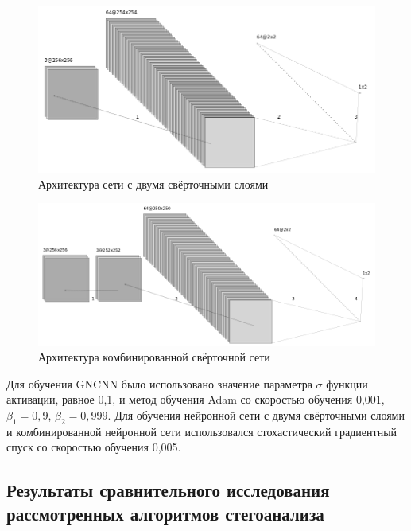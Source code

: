 \begin{figure}[!htb]
\centering
\includegraphics[width=1\textwidth]{include/graphics/french_color_architecture}
\caption{Архитектура сети с двумя свёрточными слоями}
\label{fig:FrenchCNNArchitecture}
\end{figure}

\begin{figure}[!htb]
\centering
\includegraphics[width=1\textwidth]{include/graphics/mixed_color_architecture}
\caption{Архитектура комбинированной свёрточной сети}
\label{fig:MixedCNNArchitecture}
\end{figure}

Для обучения GNCNN было использовано значение параметра $ \sigma $ функции активации, равное 0,1, и метод обучения Adam со скоростью обучения 0,001, $ \beta_1 = 0,9 $, $ \beta_2 = 0,999 $. Для обучения нейронной сети с двумя свёрточными слоями и комбинированной нейронной сети использовался стохастический градиентный спуск со скоростью обучения 0,005.

\subsection{Результаты сравнительного исследования рассмотренных алгоритмов стегоанализа}

